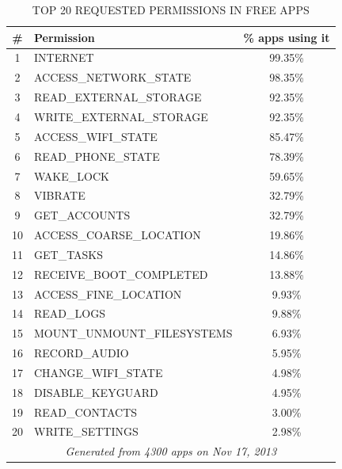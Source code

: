 \documentclass[twoside,letterpaper]{soups}
\theoremstyle{definition}
\begin{document}
\begin{table}[ht]
    \caption{TOP 20 REQUESTED PERMISSIONS IN FREE APPS}
    \label{tab:top20-permissions}
    \centering
    \begin{tabular}{clc}
        \toprule
            \#   & Permission & \% apps using it \\
            \midrule
                1  & INTERNET                       &   99.35\% \\
                2  & ACCESS\_NETWORK\_STATE         &   98.35\% \\
                3  & READ\_EXTERNAL\_STORAGE        &   92.35\% \\
                4  & WRITE\_EXTERNAL\_STORAGE       &   92.35\% \\
                5  & ACCESS\_WIFI\_STATE            &   85.47\% \\
                6  & READ\_PHONE\_STATE             &   78.39\% \\
                7  & WAKE\_LOCK                     &   59.65\% \\
                8  & VIBRATE                        &   32.79\% \\
                9  & GET\_ACCOUNTS                  &   32.79\% \\
                10 & ACCESS\_COARSE\_LOCATION       &   19.86\% \\
                11 & GET\_TASKS                     &   14.86\% \\
                12 & RECEIVE\_BOOT\_COMPLETED       &   13.88\% \\
                13 & ACCESS\_FINE\_LOCATION         &   9.93\%  \\
                14 & READ\_LOGS                     &   9.88\%  \\
                15 & MOUNT\_UNMOUNT\_FILESYSTEMS    &   6.93\%  \\
                16 & RECORD\_AUDIO                  &   5.95\%  \\
                17 & CHANGE\_WIFI\_STATE            &   4.98\%  \\
                18 & DISABLE\_KEYGUARD              &   4.95\%  \\
                19 & READ\_CONTACTS                 &   3.00\%  \\
                20 & WRITE\_SETTINGS                &   2.98\%  \\
        \midrule
            \multicolumn{3}{c}{\footnotesize \emph{Generated from 4300 apps on Nov 17, 2013}} \\
        \bottomrule
    \end{tabular}
\end{table}
\end{document}

